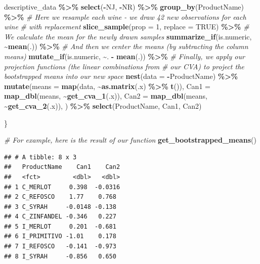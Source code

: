 \documentclass[
]{book}
\newenvironment{Shaded}{\begin{snugshade}}{\end{snugshade}}
\newcommand{\AttributeTok}[1]{\textcolor[rgb]{0.13,0.29,0.53}{#1}}
\newcommand{\CommentTok}[1]{\textcolor[rgb]{0.56,0.35,0.01}{\textit{#1}}}
\newcommand{\ConstantTok}[1]{\textcolor[rgb]{0.56,0.35,0.01}{#1}}
\newcommand{\DecValTok}[1]{\textcolor[rgb]{0.00,0.00,0.81}{#1}}
\newcommand{\FunctionTok}[1]{\textcolor[rgb]{0.13,0.29,0.53}{\textbf{#1}}}
\newcommand{\NormalTok}[1]{#1}
\newcommand{\SpecialCharTok}[1]{\textcolor[rgb]{0.81,0.36,0.00}{\textbf{#1}}}
\begin{document}
\begin{Shaded}
\begin{Highlighting}[]
\NormalTok{  descriptive\_data }\SpecialCharTok{\%\textgreater{}\%}
  \FunctionTok{select}\NormalTok{(}\SpecialCharTok{{-}}\NormalTok{NJ, }\SpecialCharTok{{-}}\NormalTok{NR) }\SpecialCharTok{\%\textgreater{}\%}
  \FunctionTok{group\_by}\NormalTok{(ProductName) }\SpecialCharTok{\%\textgreater{}\%}
    \CommentTok{\# Here we resample each wine {-} we draw 42 new observations for each wine}
    \CommentTok{\# with replacement}
  \FunctionTok{slice\_sample}\NormalTok{(}\AttributeTok{prop =} \DecValTok{1}\NormalTok{, }\AttributeTok{replace =} \ConstantTok{TRUE}\NormalTok{) }\SpecialCharTok{\%\textgreater{}\%}
    \CommentTok{\# We calculate the mean for the newly drawn samples}
  \FunctionTok{summarize\_if}\NormalTok{(is.numeric, }\SpecialCharTok{\textasciitilde{}}\FunctionTok{mean}\NormalTok{(.)) }\SpecialCharTok{\%\textgreater{}\%} 
    \CommentTok{\# And then we center the means (by subtracting the column means)}
  \FunctionTok{mutate\_if}\NormalTok{(is.numeric, }\SpecialCharTok{\textasciitilde{}}\NormalTok{. }\SpecialCharTok{{-}} \FunctionTok{mean}\NormalTok{(.)) }\SpecialCharTok{\%\textgreater{}\%}
    \CommentTok{\# Finally, we apply our projection functions (the linear combinations from}
    \CommentTok{\# our CVA) to project the bootstrapped means into our new space}
  \FunctionTok{nest}\NormalTok{(}\AttributeTok{data =} \SpecialCharTok{{-}}\NormalTok{ProductName) }\SpecialCharTok{\%\textgreater{}\%}
  \FunctionTok{mutate}\NormalTok{(}\AttributeTok{means =} \FunctionTok{map}\NormalTok{(data, }\SpecialCharTok{\textasciitilde{}}\FunctionTok{as.matrix}\NormalTok{(.x) }\SpecialCharTok{\%\textgreater{}\%} \FunctionTok{t}\NormalTok{()),}
         \AttributeTok{Can1 =} \FunctionTok{map\_dbl}\NormalTok{(means, }\SpecialCharTok{\textasciitilde{}}\FunctionTok{get\_cva\_1}\NormalTok{(.x)),}
         \AttributeTok{Can2 =} \FunctionTok{map\_dbl}\NormalTok{(means, }\SpecialCharTok{\textasciitilde{}}\FunctionTok{get\_cva\_2}\NormalTok{(.x)),}
\NormalTok{         ) }\SpecialCharTok{\%\textgreater{}\%}
    \FunctionTok{select}\NormalTok{(ProductName, Can1, Can2)}
  
\NormalTok{\}}

\CommentTok{\# For example, here is the result of our function}
\FunctionTok{get\_bootstrapped\_means}\NormalTok{()}
\end{Highlighting}
\end{Shaded}

\begin{verbatim}
## # A tibble: 8 x 3
##   ProductName    Can1    Can2
##   <fct>         <dbl>   <dbl>
## 1 C_MERLOT     0.398  -0.0316
## 2 C_REFOSCO    1.77    0.768 
## 3 C_SYRAH     -0.0148 -0.138 
## 4 C_ZINFANDEL -0.346   0.227 
## 5 I_MERLOT     0.201  -0.681 
## 6 I_PRIMITIVO -1.01    0.178 
## 7 I_REFOSCO   -0.141  -0.973 
## 8 I_SYRAH     -0.856   0.650
\end{verbatim}
\end{document}
